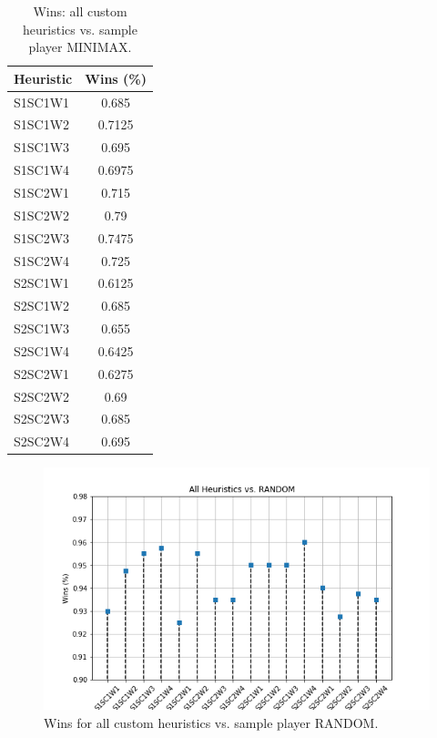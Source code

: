 \documentclass[a4paper]{article}
\begin{document}
    \begin{table}[htpb]
    \caption{ Wins: all custom heuristics vs. sample player MINIMAX.}
    \centering
    \begin{tabular}{ l | c }
    Heuristic & Wins (\%) \\ \hline 
    S1SC1W1 & 0.685 \\
    S1SC1W2 & 0.7125 \\
    S1SC1W3 & 0.695 \\
    S1SC1W4 & 0.6975 \\
    S1SC2W1 & 0.715 \\
    S1SC2W2 & 0.79 \\
    S1SC2W3 & 0.7475 \\
    S1SC2W4 & 0.725 \\
    S2SC1W1 & 0.6125 \\
    S2SC1W2 & 0.685 \\
    S2SC1W3 & 0.655 \\
    S2SC1W4 & 0.6425 \\
    S2SC2W1 & 0.6275 \\
    S2SC2W2 & 0.69 \\
    S2SC2W3 & 0.685 \\
    S2SC2W4 & 0.695 
    \end{tabular}
    \label{tabwinsMINIMAX}
    \end{table}

    


\begin{figure}[htpb]
\begin{center}
\includegraphics[width=1\columnwidth]{fig/results_Wins_All_vs_RANDOM.png}
\caption{Wins for all custom heuristics vs. sample player RANDOM.}
\end{center}
\label{figwinsRANDOM}
\end{figure}
    
\end{document}
